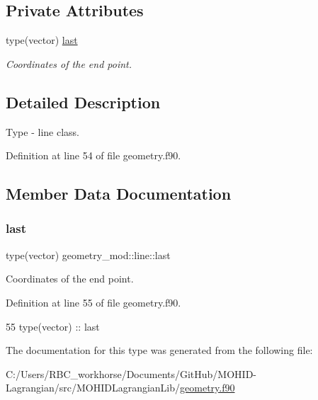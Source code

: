 \subsection*{Private Attributes}
\begin{DoxyCompactItemize}
\item 
type(vector) \mbox{\hyperlink{structgeometry__mod_1_1line_a1f7c879c60698c2f903f5258ad6f446c}{last}}
\begin{DoxyCompactList}\small\item\em Coordinates of the end point. \end{DoxyCompactList}\end{DoxyCompactItemize}


\subsection{Detailed Description}
Type -\/ line class. 

Definition at line 54 of file geometry.\+f90.



\subsection{Member Data Documentation}
\mbox{\label{structgeometry__mod_1_1line_a1f7c879c60698c2f903f5258ad6f446c}} 
\subsubsection{\texorpdfstring{last}{last}}
{\footnotesize\ttfamily type(vector) geometry\+\_\+mod\+::line\+::last\hspace{0.3cm}{\ttfamily [private]}}



Coordinates of the end point. 



Definition at line 55 of file geometry.\+f90.


\begin{DoxyCode}
55         \textcolor{keywordtype}{type}(vector) :: last
\end{DoxyCode}


The documentation for this type was generated from the following file\+:\begin{DoxyCompactItemize}
\item 
C\+:/\+Users/\+R\+B\+C\+\_\+workhorse/\+Documents/\+Git\+Hub/\+M\+O\+H\+I\+D-\/\+Lagrangian/src/\+M\+O\+H\+I\+D\+Lagrangian\+Lib/\mbox{\hyperlink{geometry_8f90}{geometry.\+f90}}\end{DoxyCompactItemize}
